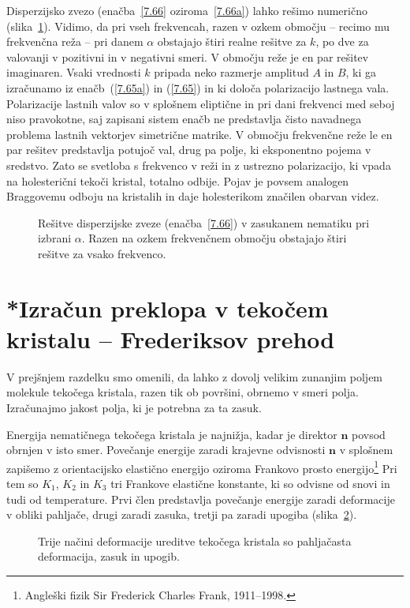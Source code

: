 \begin{remark}
Disperzijsko zvezo (enačba~\ref{7.66} oziroma~\ref{7.66a}) 
lahko rešimo numerično (slika~\ref{gap}). Vidimo, da pri 
vseh frekvencah, razen v ozkem območju -- recimo mu frekvenčna reža --
pri danem $\alpha$ obstajajo štiri realne rešitve za $k$, 
po dve za valovanji v pozitivni in v negativni smeri.
V območju reže je en par rešitev imaginaren. Vsaki vrednosti $k$
pripada neko razmerje amplitud $A$ in $B$, ki ga izračunamo
iz enačb~(\ref{7.65a}) in (\ref{7.65}) in ki določa polarizacijo lastnega vala. Polarizacije
lastnih valov so v splošnem eliptične in pri dani frekvenci med
seboj niso pravokotne, saj zapisani sistem enačb ne predstavlja čisto 
navadnega problema lastnih vektorjev simetrične matrike. 
V območju frekvenčne reže le en par rešitev predstavlja
potujoč val, drug pa polje, ki eksponentno pojema v sredstvo. Zato
se svetloba s frekvenco v reži in z ustrezno polarizacijo, ki vpada
na holesterični tekoči kristal, totalno odbije. Pojav je povsem analogen
Braggovemu odboju na kristalih in daje holesterikom značilen obarvan
videz.
\begin{figure}[h]
\centering
\def\svgwidth{70truemm} 

\caption{Rešitve disperzijske zveze (enačba~\ref{7.66}) v zasukanem nematiku
pri izbrani $\alpha$. Razen na ozkem frekvenčnem območju obstajajo štiri 
rešitve za vsako frekvenco.}
\label{gap}
\end{figure}
\end{remark}

\section{*Izračun preklopa v tekočem kristalu -- Frederiksov prehod}
V prejšnjem razdelku smo omenili, da lahko z dovolj velikim zunanjim poljem 
molekule tekočega kristala, razen tik ob površini, obrnemo v smeri polja. 
Izračunajmo jakost polja, ki je potrebna za ta zasuk. 

Energija nematičnega tekočega kristala je najnižja, kadar je direktor $\mathbf{n}$
povsod obrnjen v isto smer. Povečanje energije zaradi krajevne odvisnosti $\mathbf{n}$
v splošnem zapišemo z orientacijsko elastično energijo oziroma Frankovo prosto 
energijo\footnote{Angleški fizik Sir Frederick Charles Frank, 1911--1998.}
Pri tem so $K_{1}$, $K_{2}$ in $K_{3}$ tri Frankove elastične
konstante, ki so odvisne od snovi in tudi od temperature. 
Prvi člen predstavlja povečanje energije zaradi deformacije v obliki 
pahljače, drugi zaradi zasuka, tretji pa zaradi upogiba (slika~\ref{s7.20}).
\begin{figure}[h]
\centering
\def\svgwidth{140truemm} 

\caption{Trije načini deformacije ureditve tekočega kristala so pahljačasta deformacija,
zasuk in upogib.}
\label{s7.20}
\end{figure}

